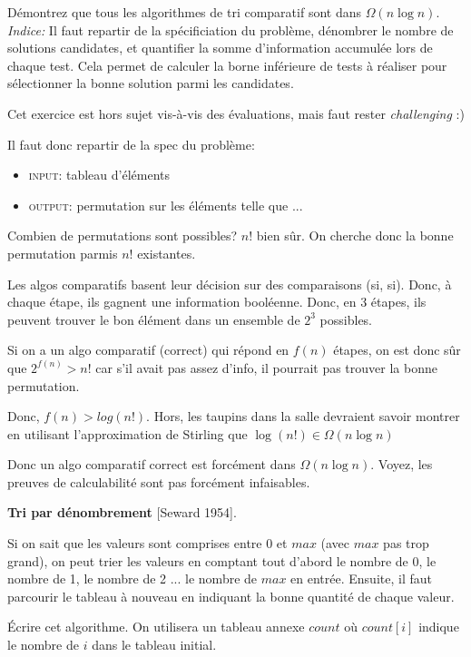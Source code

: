 \documentclass[10pt]{article}\usepackage[correction]{esial}
\begin{document}
\Question Démontrez que tous les algorithmes de tri comparatif sont dans
$\Omega(n\log n)$. \\
\noindent \textit{Indice:} Il faut repartir de la spécificiation du problème,
dénombrer le nombre de solutions candidates, et quantifier la somme
d'information accumulée lors de chaque test. Cela permet de calculer la borne
inférieure de tests à réaliser pour sélectionner la bonne solution parmi les
candidates. 
\begin{Reponse}
  Cet exercice est hors sujet vis-à-vis des évaluations, mais faut rester
  \textit{challenging} :)

  Il faut donc repartir de la spec du problème:
  \begin{itemize}
  \item \textsc{input}: tableau d'éléments
  \item \textsc{output}: permutation sur les éléments telle que ...
  \end{itemize}

  Combien de permutations sont possibles? $n!$ bien sûr. On cherche donc la
  bonne permutation parmis $n!$ existantes.

  Les algos comparatifs basent leur décision sur des comparaisons (si,
  si). Donc, à chaque étape, ils gagnent une information booléenne. Donc, en 3
  étapes, ils peuvent trouver le bon élément dans un ensemble de $2^3$
  possibles.

  Si on a un algo comparatif (correct) qui répond en $f(n)$ étapes, on est donc
  sûr que $2^{f(n)}>n!$ car s'il avait pas assez d'info, il pourrait pas
  trouver la bonne permutation. 

  Donc, $f(n)>log(n!)$. Hors, les taupins dans la salle devraient savoir
  montrer en utilisant l'approximation de Stirling que 
  $\log(n!)\in\Omega(n\log n)$

  Donc un algo comparatif correct est forcément dans $\Omega(n\log n)$. Voyez,
  les preuves de calculabilité sont pas forcément infaisables.
\end{Reponse}

\Exercice \textbf{Tri par dénombrement} [Seward 1954].

Si on sait que les valeurs sont comprises entre 0 et $max$ (avec $max$
pas trop grand), on peut trier les valeurs en comptant tout d'abord le nombre
de 0, le nombre de 1, le nombre de 2 ... le nombre de $max$ en entrée. Ensuite,
il faut parcourir le tableau à nouveau en indiquant la bonne quantité de
chaque valeur.

\Question Écrire cet algorithme. On utilisera un tableau annexe $count$ où
$count[i]$ indique le nombre de $i$ dans le tableau initial.
\end{document}
